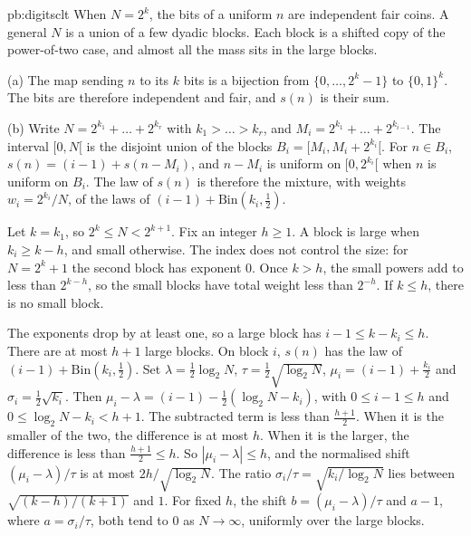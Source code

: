 \begin{solution}{pb:digitsclt}
\idea When $N=2^k$, the bits of a uniform $n$ are independent fair coins. A general $N$ is a union of a few dyadic blocks. Each block is a shifted
copy of the power-of-two case, and almost all the mass sits in the large blocks.

\writeup (a) The map sending $n$ to its $k$ bits is a bijection from $\{0,\dots,2^k-1\}$ to $\{0,1\}^k$. The bits are therefore independent and fair, and
$s(n)$ is their sum.

(b) Write $N=2^{k_1}+\dots+2^{k_r}$ with $k_1>\dots>k_r$, and $M_i=2^{k_1}+\dots+2^{k_{i-1}}$. The interval $[0,N[$ is the disjoint union of
the blocks $B_i=[M_i,M_i+2^{k_i}[$. For $n\in B_i$, $s(n)=(i-1)+s(n-M_i)$, and $n-M_i$ is uniform on $[0,2^{k_i}[$ when $n$ is uniform
on $B_i$. The law of $s(n)$ is therefore the mixture, with weights $w_i=2^{k_i}/N$, of the laws of $(i-1)+\mathrm{Bin}(k_i,\frac12)$.

Let $k=k_1$, so $2^k\le N<2^{k+1}$. Fix an integer $h\ge1$. A block is large when $k_i\ge k-h$, and small otherwise. The index does not control the size: for $N=2^k+1$ the second block has exponent $0$. Once $k>h$, the small powers add to less than $2^{k-h}$, so the small blocks have total weight less than $2^{-h}$. If $k\le h$, there is no small block.

The exponents drop by at least one, so a large block has $i-1\le k-k_i\le h$. There are at most $h+1$ large blocks. On block $i$, $s(n)$ has the law of $(i-1)+\mathrm{Bin}(k_i,\frac12)$. Set $\lambda=\frac12\log_2N$, $\tau=\frac12\sqrt{\log_2N}$, $\mu_i=(i-1)+\frac{k_i}2$ and $\sigma_i=\frac12\sqrt{k_i}$. Then $\mu_i-\lambda=(i-1)-\frac12(\log_2N-k_i)$, with $0\le i-1\le h$ and $0\le\log_2N-k_i<h+1$. The subtracted term is less than $\frac{h+1}2$. When it is the smaller of the two, the difference is at most $h$. When it is the larger, the difference is less than $\frac{h+1}2\le h$. So $|\mu_i-\lambda|\le h$, and the normalised shift $(\mu_i-\lambda)/\tau$ is at most $2h/\sqrt{\log_2N}$. The ratio $\sigma_i/\tau=\sqrt{k_i/\log_2N}$ lies between $\sqrt{(k-h)/(k+1)}$ and $1$. For fixed $h$, the shift $b=(\mu_i-\lambda)/\tau$ and $a-1$, where $a=\sigma_i/\tau$, both tend to $0$ as $N\to\infty$, uniformly over the large blocks.


\end{solution}
